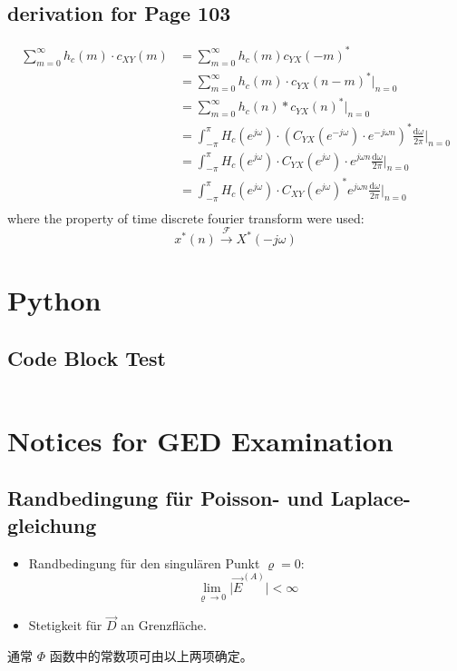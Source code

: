 \documentclass[nochapterpage,bigchapter,linedtoc,longdoc,colorback,accentcolor=tud2c]{tudreport}
\begin{document}
\section{derivation for Page 103}
\begin{equation*}
	\begin{aligned}
		\sum_{m=0}^\infty h_c(m)\cdot c_{XY}(m) &= \sum_{m=0}^\infty h_c(m) c_{YX}(-m)^*\\ &= \sum_{m=0}^\infty h_c(m)\cdot c_{YX}(n-m)^* \bigg|_{n=0} \\
		     &= \sum_{m=0}^\infty h_c(n)*c_{YX}(n)^* \bigg|_{n=0}\\
			 &= \int_{-\pi}^{\pi}H_c(e^{j\omega}) \cdot \left( C_{YX}(e^{-j\omega})\cdot e^{-j\omega n} \right)^* \frac{\mathrm{d}\omega}{2\pi} \bigg|_{n=0} \\
			 &= \int_{-\pi}^{\pi}H_c(e^{j\omega}) \cdot C_{YX}(e^{j\omega}) \cdot e^{j\omega n} \frac{\mathrm{d}\omega}{2\pi}\bigg|_{n=0}\\ 
			 &=\int_{-\pi}^{\pi}H_c(e^{j\omega}) \cdot C_{XY}(e^{j\omega})^* e^{j\omega n} \frac{\mathrm{d}\omega}{2\pi}\bigg|_{n=0}\\			
	\end{aligned}
\end{equation*} 
where the property of time discrete fourier transform were used:
\begin{equation*}
  x^*(n) \xrightarrow{\mathscr{F}} X^*(-j \omega)
\end{equation*}   
\chapter{Python}
\section{Code Block Test}
\inputminted[linenos=true,firstline=1,breaklines = true,bgcolor=bg,fontfamily=tt,xleftmargin=\parindent]{python}{saradc.py}
\newpage
\chapter{Notices for GED Examination}     
\section{Randbedingung für Poisson- und Laplace-gleichung}
\begin{itemize}
	\item Randbedingung für den singulären Punkt $\varrho=0$:
		$$ \lim_{\varrho \to 0}\big|\vec{E}^{(A)}\big| < \infty$$
	\item Stetigkeit für $\vec{D}$ an Grenzfläche.
\end{itemize}
通常 $\Phi$ 函数中的常数项可由以上两项确定。
\end{document}

